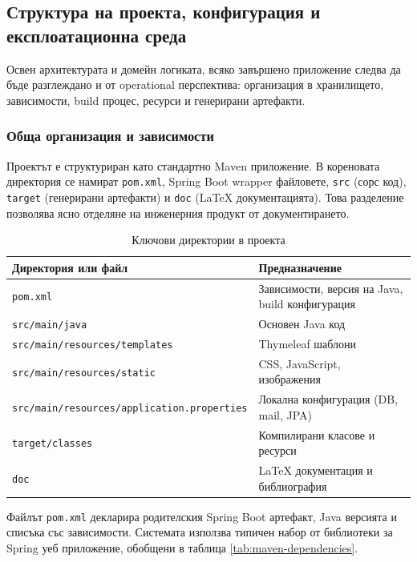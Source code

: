 \subsection{Структура на проекта, конфигурация и експлоатационна среда}

Освен архитектурата и домейн логиката, всяко завършено приложение следва да бъде разглеждано и от operational перспектива: организация в хранилището, зависимости, build процес, ресурси и генерирани артефакти.

\subsubsection{Обща организация и зависимости}

Проектът е структуриран като стандартно Maven приложение. В кореновата директория се намират \texttt{pom.xml}, Spring Boot wrapper файловете, \texttt{src} (сорс код), \texttt{target} (генерирани артефакти) и \texttt{doc} (LaTeX документацията). Това разделение позволява ясно отделяне на инженерния продукт от документирането.

\begin{table}[H]
    \centering
    \caption{Ключови директории в проекта}
    \label{tab:project-directories}
    \begin{tabularx}{\textwidth}{L{4.5cm}Y}
        \toprule
        Директория или файл & Предназначение \\
        \midrule
        \texttt{pom.xml} & Зависимости, версия на Java, build конфигурация \\
        \texttt{src/main/java} & Основен Java код \\
        \texttt{src/main/resources/templates} & Thymeleaf шаблони \\
        \texttt{src/main/resources/static} & CSS, JavaScript, изображения \\
        \texttt{src/main/resources/application.properties} & Локална конфигурация (DB, mail, JPA) \\
        \texttt{target/classes} & Компилирани класове и ресурси \\
        \texttt{doc} & LaTeX документация и библиография \\
        \bottomrule
    \end{tabularx}
\end{table}

Файлът \texttt{pom.xml} декларира родителския Spring Boot артефакт, Java версията и списъка със зависимости. Системата използва типичен набор от библиотеки за Spring уеб приложение, обобщени в таблица \ref{tab:maven-dependencies}.

